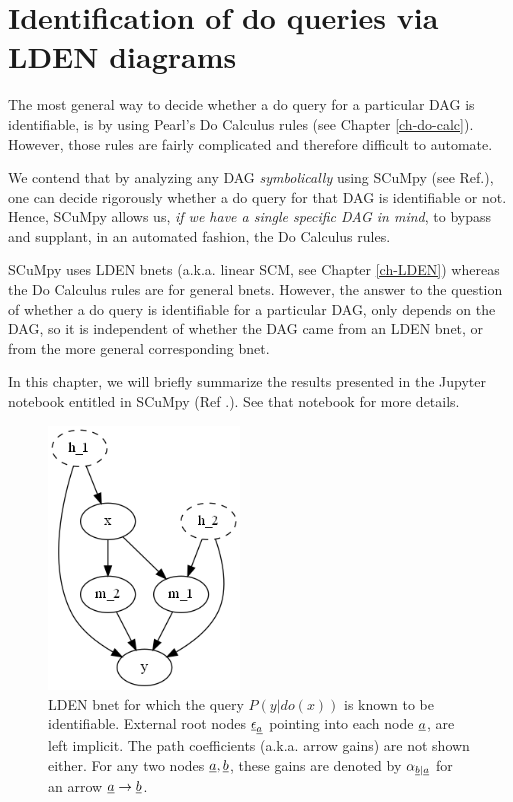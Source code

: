 \chapter{Identification of do queries via LDEN
diagrams}
\label{ch-iden-LDEN}

The most general way to decide whether a do query for
a particular DAG is identifiable, is by using Pearl's
Do Calculus rules (see Chapter \ref{ch-do-calc}). However, those rules are fairly 
complicated and therefore difficult to automate.


We contend that by analyzing any DAG {\it symbolically} using 
SCuMpy (see Ref.\cite{scumpy}), one can decide rigorously 
whether a
do query for that DAG is identifiable or not. Hence, SCuMpy
allows us, {\it if we have a single specific DAG in mind}, to bypass and supplant, in an automated 
fashion, the Do Calculus rules.

SCuMpy uses
LDEN bnets (a.k.a. linear SCM, see Chapter \ref{ch-LDEN}) whereas
the Do Calculus rules are for general bnets.
However, the answer to the question
of whether a do query is identifiable
for a particular DAG,
only depends on the DAG,
so it is independent of whether
the DAG came from an LDEN bnet, or from
the more general corresponding bnet.


In this chapter,
we will briefly summarize the results
presented in the
Jupyter notebook entitled  in SCuMpy (Ref
.\cite{scumpy}). See that notebook
for more details.

\begin{figure}[h!]
\centering
\includegraphics[width=2in]
{iden-LDEN/uncon-children.png}
\caption{LDEN bnet for which
the query $P(y|do(x))$
is  known to be identifiable.
External root nodes $\rveps_\rva$ 
pointing into each node $\rva$,
are left implicit.
The path coefficients (a.k.a.
arrow gains)
are not shown either. 
For any two nodes $\rva, \rvb$,
these gains
 are denoted
   by $\alp_{\rvb|\rva}$
for an arrow $\rva\rarrow \rvb$.}
\label{fig-uncon-children}
\end{figure}

